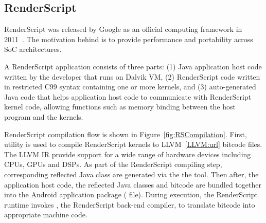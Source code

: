 
\subsection{RenderScript}
RenderScript was released by Google as an official computing framework in
2011~\cite{RederScript:url}. The motivation behind is to provide
performance and portability across SoC architectures.

A RenderScript application consists of three parts: (1) Java application host
code written by the developer that runs on Dalvik VM, (2) RenderScript code
written in restricted C99 syntax containing one or more kernels, and (3)
auto-generated Java code that helps application host code to communicate with
RenderScript kernel code, allowing functions such as memory binding between the
host program and the kernels.

RenderScript compilation flow is shown in Figure~\ref{fig:RSCompilation}.
First,  utility is used to compile RenderScript kernels to
LLVM~\ref{LLVM:url} bitcode files. The LLVM IR provide support for a wide range of hardware
devices including CPUs, GPUs and DSPs. 
As part of the RenderScript compiling step, corresponding reflected Java class
are generated via the  the  tool.
Then after, the application host code, the reflected Java classes and bitcode
are bundled together into the Android application package ( file).
During execution, the RenderScript
runtime invokes , the RenderScript back-end compiler, to translate
bitcode into appropriate machine code.


